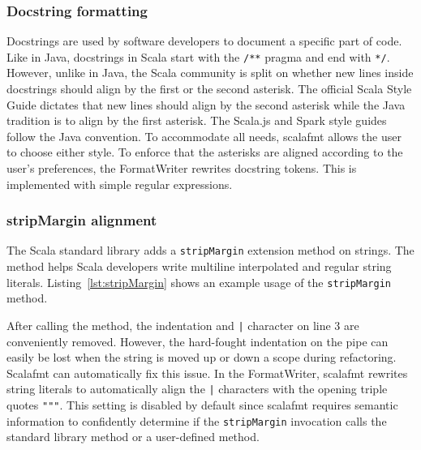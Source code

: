 \subsubsection{Docstring formatting}\label{sec:docstring}
Docstrings are used by software developers to document a specific part of code.
Like in Java, docstrings in Scala start with the \texttt{/**} pragma and end with \texttt{*/}.
However, unlike in Java, the Scala community is split on whether new lines inside docstrings should align by the first or the second asterisk.
The official Scala Style Guide\autocite{Scala80:online} dictates that new lines should align by the second asterisk while the Java tradition is to align by the first asterisk.
The Scala.js\autocite{doeraene_scala.js_2015} and Spark\autocite{xin_spark_2015} style guides follow the Java convention.
To accommodate all needs, scalafmt allows the user to choose either style.
To enforce that the asterisks are aligned according to the user's preferences,
the FormatWriter rewrites docstring tokens.
This is implemented with simple regular expressions.

\subsubsection{stripMargin alignment}
The Scala standard library adds a \texttt{stripMargin} extension method on strings.
The method helps Scala developers write multiline interpolated and regular string literals.
Listing~\ref{lst:stripMargin} shows an example usage of the \texttt{stripMargin} method.

After calling the method, the indentation and \texttt{|} character on line 3 are conveniently removed.
However, the hard-fought indentation on the pipe can easily be lost when the string is moved up or down a scope during refactoring.
Scalafmt can automatically fix this issue.
In the FormatWriter, scalafmt rewrites string literals to automatically align the \texttt{|} characters with the opening triple quotes \texttt{"""}.
This setting is disabled by default since scalafmt requires semantic information to confidently determine if the \texttt{stripMargin} invocation calls the standard library method or a user-defined method.

